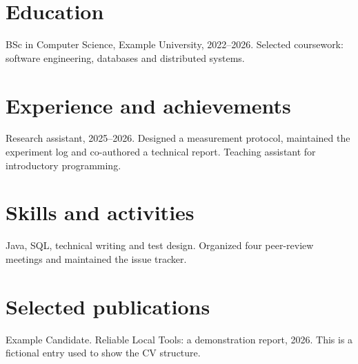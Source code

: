 \section{Education}
BSc in Computer Science, Example University, 2022--2026. Selected coursework: software engineering, databases and distributed systems.

\section{Experience and achievements}
Research assistant, 2025--2026. Designed a measurement protocol, maintained the experiment log and co-authored a technical report. Teaching assistant for introductory programming.

\section{Skills and activities}
Java, SQL, technical writing and test design. Organized four peer-review meetings and maintained the issue tracker.

\section{Selected publications}
Example Candidate. Reliable Local Tools: a demonstration report, 2026. This is a fictional entry used to show the CV structure.

